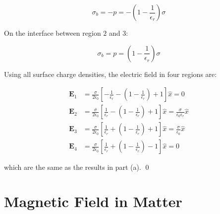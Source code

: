 \documentclass[12pt]{article}
\begin{document}
\begin{equation}
    \sigma_{b} = -p = -\left( 1 - \frac{1}{\epsilon_{r}} \right) \sigma
\end{equation}

On the interface between region $2$ and $3$:

\begin{equation}
    \sigma_{b} = p = \left( 1 - \frac{1}{\epsilon_{r}} \right) \sigma
\end{equation}

Using all surface charge densities, the electric field in four regions are:

\begin{equation}
\begin{split}
    \mathbf{E}_{1} &= \frac{\sigma}{2\epsilon_{0}} \left[ -\frac{1}{\epsilon_{r}} - \left( 1 - \frac{1}{\epsilon_{r}} \right) + 1 \right] \hat{x} = 0 \\
    \mathbf{E}_{2} &= \frac{\sigma}{2\epsilon_{0}} \left[ \frac{1}{\epsilon_{r}} - \left( 1 - \frac{1}{\epsilon_{r}} \right) + 1 \right] \hat{x} = \frac{\sigma}{\epsilon_{0}\epsilon_{r}} \hat{x} \\
    \mathbf{E}_{3} &= \frac{\sigma}{2\epsilon_{0}} \left[ \frac{1}{\epsilon_{r}} + \left( 1 - \frac{1}{\epsilon_{r}} \right) + 1 \right] \hat{x} = \frac{\sigma}{\epsilon_{0}} \hat{x} \\
    \mathbf{E}_{4} &= \frac{\sigma}{2\epsilon_{0}} \left[ \frac{1}{\epsilon_{r}} + \left( 1 - \frac{1}{\epsilon_{r}} \right) - 1 \right] \hat{x} = 0
\end{split}
\end{equation}

which are the same as the results in part (a).
\qed







\pagebreak
\section*{Magnetic Field in Matter}


\problem{}{}
\end{document}

